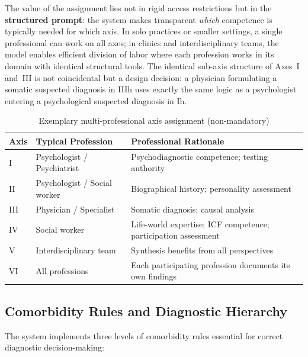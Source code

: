 \documentclass[11pt,a4paper]{article}
\begin{document}
The value of the assignment lies not in rigid access restrictions but in the \textbf{structured prompt}: the system makes transparent \textit{which} competence is typically needed for which axis. In solo practices or smaller settings, a single professional can work on all axes; in clinics and interdisciplinary teams, the model enables efficient division of labor where each profession works in its domain with identical structural tools. The identical sub-axis structure of Axes~I and~III is not coincidental but a design decision: a physician formulating a somatic suspected diagnosis in IIIh uses exactly the same logic as a psychologist entering a psychological suspected diagnosis in Ih.

\begin{table}[H]
\centering
\caption{Exemplary multi-professional axis assignment (non-mandatory)}
\label{tab:professions}
\begin{tabularx}{\textwidth}{lXX}
\toprule
\textbf{Axis} & \textbf{Typical Profession} & \textbf{Professional Rationale} \\
\midrule
I & Psychologist / Psychiatrist & Psychodiagnostic competence; testing authority \\
\addlinespace
II & Psychologist / Social worker & Biographical history; personality assessment \\
\addlinespace
III & Physician / Specialist & Somatic diagnosis; causal analysis \\
\addlinespace
IV & Social worker & Life-world expertise; ICF competence; participation assessment \\
\addlinespace
V & Interdisciplinary team & Synthesis benefits from all perspectives \\
\addlinespace
VI & All professions & Each participating profession documents its own findings \\
\bottomrule
\end{tabularx}
\end{table}

\subsection{Comorbidity Rules and Diagnostic Hierarchy}
\label{sec:comorbidity}

The system implements three levels of comorbidity rules essential for correct diagnostic decision-making:
\end{document}
